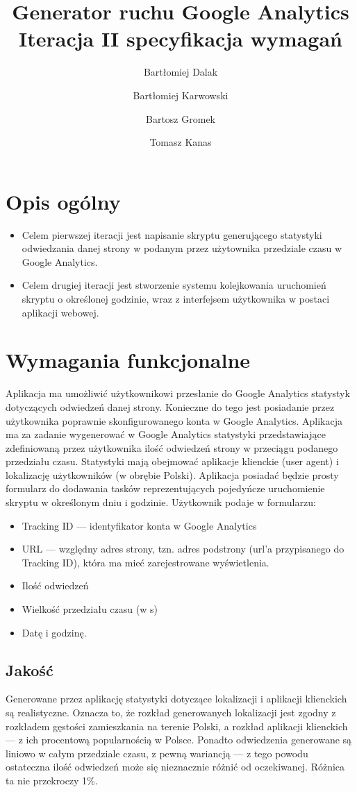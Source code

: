 \documentclass{article}
\title{Generator ruchu Google Analytics \\ Iteracja II specyfikacja wymagań}
\author{Bartłomiej Dalak \and Bartłomiej Karwowski \and Bartosz Gromek \and Tomasz Kanas}
\begin{document}
\maketitle

\section{Opis ogólny}
\begin{itemize}
\item Celem pierwszej iteracji jest napisanie skryptu generującego statystyki odwiedzania danej strony w podanym przez użytownika przedziale czasu w Google Analytics.
\item Celem drugiej iteracji jest stworzenie systemu kolejkowania uruchomień skryptu o określonej godzinie, wraz z interfejsem użytkownika w postaci aplikacji webowej.
\end{itemize}

\section{Wymagania funkcjonalne}

Aplikacja ma umożliwić użytkownikowi przesłanie do Google Analytics statystyk dotyczących odwiedzeń danej strony. Konieczne do tego jest posiadanie przez użytkownika poprawnie skonfigurowanego konta w Google Analytics. Aplikacja ma za zadanie wygenerować w Google Analytics statystyki przedstawiające zdefiniowaną przez użytkownika ilość odwiedzeń strony w przeciągu podanego przedziału czasu. Statystyki mają obejmować aplikacje klienckie (user agent) i lokalizację użytkowników (w obrębie Polski). Aplikacja posiadać będzie prosty formularz do dodawania tasków reprezentujących pojedyńcze uruchomienie skryptu w określonym dniu i godzinie. Użytkownik podaje w formularzu:
\begin{itemize}
\item Tracking ID --- identyfikator konta w Google Analytics
\item URL --- względny adres strony, tzn. adres podstrony (url'a przypisanego do Tracking ID), która ma mieć zarejestrowane wyświetlenia.
\item Ilość odwiedzeń
\item Wielkość przedziału czasu (w s)
\item Datę i godzinę.
\end{itemize}

\subsection{Jakość}
Generowane przez aplikację statystyki dotyczące lokalizacji i aplikacji klienckich są realistyczne. Oznacza to, że rozkład generowanych lokalizacji jest zgodny z rozkładem gęstości zamieszkania na terenie Polski, a rozkład aplikacji klienckich --- z ich procentową popularnością w Polsce. Ponadto odwiedzenia generowane są liniowo w całym przedziale czasu, z pewną wariancją --- z tego powodu ostateczna ilość odwiedzeń może się nieznacznie różnić od oczekiwanej. Różnica ta nie przekroczy 1\%.
\end{document}
